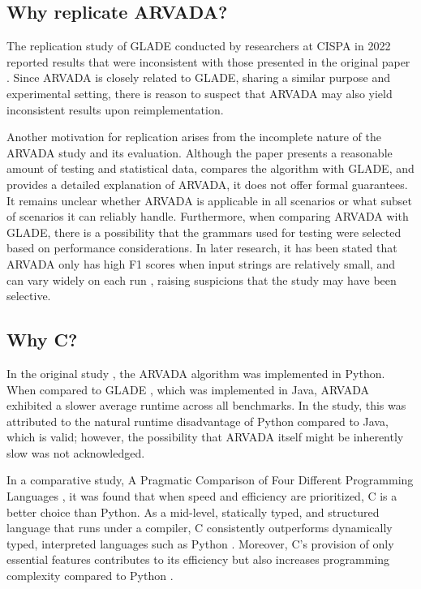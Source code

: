 \subsection{Why replicate ARVADA?}
The replication study of GLADE \cite{bastaniSynthesizingProgramInput} conducted by researchers at CISPA \cite{bendrissouSynthesizingInputGrammars2022} in 2022 reported results that were inconsistent with those presented in the original paper \cite{bastaniSynthesizingProgramInput}. Since ARVADA is closely related to GLADE, sharing a similar purpose and experimental setting, there is reason to suspect that ARVADA may also yield inconsistent results upon reimplementation.

\vspace{\baselineskip}

Another motivation for replication arises from the incomplete nature of the ARVADA study and its evaluation. Although the paper presents a reasonable amount of testing and statistical data, compares the algorithm with GLADE, and provides a detailed explanation of ARVADA, it does not offer formal guarantees. It remains unclear whether ARVADA is applicable in all scenarios or what subset of scenarios it can reliably handle. Furthermore, when comparing ARVADA with GLADE, there is a possibility that the grammars used for testing were selected based on performance considerations. In later research, it has been stated that ARVADA only has high F1 scores when input strings are relatively small, and can vary widely on each run \cite{arefinFastDeterministicBlackbox2024}, raising suspicions that the study may have been selective.

\subsection{Why C?}

In the original study \cite{kulkarniLearningHighlyRecursive2021}, the ARVADA algorithm was implemented in Python. When compared to GLADE \cite{bastaniSynthesizingProgramInput}, which was implemented in Java, ARVADA exhibited a slower average runtime across all benchmarks. In the study, this was attributed to the natural runtime disadvantage of Python compared to Java, which is valid; however, the possibility that ARVADA itself might be inherently slow was not acknowledged.

\vspace{\baselineskip}

In a comparative study, A Pragmatic Comparison of Four Different Programming Languages \cite{aliPragmaticComparisonFour2021}, it was found that when speed and efficiency are prioritized, C is a better choice than Python. As a mid-level, statically typed, and structured language that runs under a compiler, C consistently outperforms dynamically typed, interpreted languages such as Python \cite{kumarPythonLanguageComparison2022}. Moreover, C’s provision of only essential features contributes to its efficiency but also increases programming complexity compared to Python \cite{aliPragmaticComparisonFour2021, kumarPythonLanguageComparison2022}.

